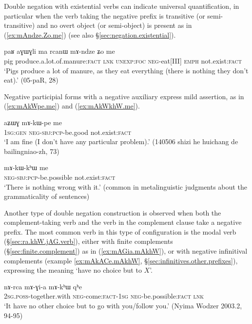 Double negation with existential verbs can indicate universal quantification, in particular when the verb taking the negative prefix is transitive (or semi-transitive) and no overt object (or semi-object) is present as in (\ref{ex:mAndze.Zo.me}) (see also §\ref{sec:negation.existential}).

\begin{exe}
	\ex \label{ex:mAndze.Zo.me}
	\gll paʁ aɣɯɣli ma rcanɯ mɤ-ndze ʑo me  \\
	pig produce.a.lot.of.manure:\textsc{fact} \textsc{lnk} \textsc{unexp}:\textsc{foc} \textsc{neg}-eat[III] \textsc{emph} not.exist:\textsc{fact} \\
	\glt `Pigs produce a lot of manure, as they eat everything (there is nothing they don't eat).' (05-paR, 28)
\end{exe}
Negative participial forms with a negative auxiliary express mild assertion, as in (\ref{ex:mAkWpe.me}) and (\ref{ex:mAkWkhW.me}).

\begin{exe}
	\ex \label{ex:mAkWpe.me}
	\gll aʑɯɣ mɤ-kɯ-pe me \\
	\textsc{1sg}:\textsc{gen} \textsc{neg}-\textsc{sbj}:\textsc{pcp}-be.good not.exist:\textsc{fact} \\
	\glt `I am fine (I don't have any particular problem).' (140506 shizi he huichang de bailingniao-zh, 73)
\end{exe}

\begin{exe}
	\ex \label{ex:mAkWkhW.me}
	\gll mɤ-kɯ-kʰɯ me \\
	\textsc{neg}-\textsc{sbj}:\textsc{pcp}-be.possible not.exist:\textsc{fact} \\
	\glt `There is nothing wrong with it.' (common in metalinguistic judgments about the grammaticality of sentences)
\end{exe}

Another type of double negation construction is observed when both the com\-plement-taking verb and the verb in the complement clause take a negative prefix. The most common verb in this type of configuration is the modal verb  (§\ref{sec:ra.khW.jAG.verb}), either with finite complements (§\ref{sec:finite.complement}) as in (\ref{ex:mAGia.mAkhW}), or with negative infinitival complements (example \ref{ex:mAkACe.mAkhW}, §\ref{sec:infinitives.other.prefixes}), expressing the meaning `have no choice but to $X$'.


\begin{exe}
	\ex \label{ex:mAGia.mAkhW}
	\gll  nɤ-rca mɤ-ɣi-a mɤ-kʰɯ qʰe \\
	\textsc{2sg}.\textsc{poss}-together.with \textsc{neg}-come:\textsc{fact}-\textsc{1sg} \textsc{neg}-be.possible:\textsc{fact} \textsc{lnk} \\
	\glt `It have no other choice but to go with you/follow you.' (Nyima Wodzer 2003.2, 94-95)
\end{exe}

